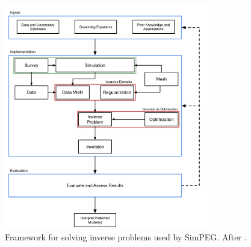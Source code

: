\begin{figure}[!htb]
    \begin{center}
    \includegraphics[width=0.8\textwidth]{figures/simpeg-framework.png}
    \end{center}
\caption{
     Framework for solving inverse problems used by SimPEG. After \cite{cockett_simpeg_2015}.
}
\label{fig:simpeg-framework}
\end{figure}
